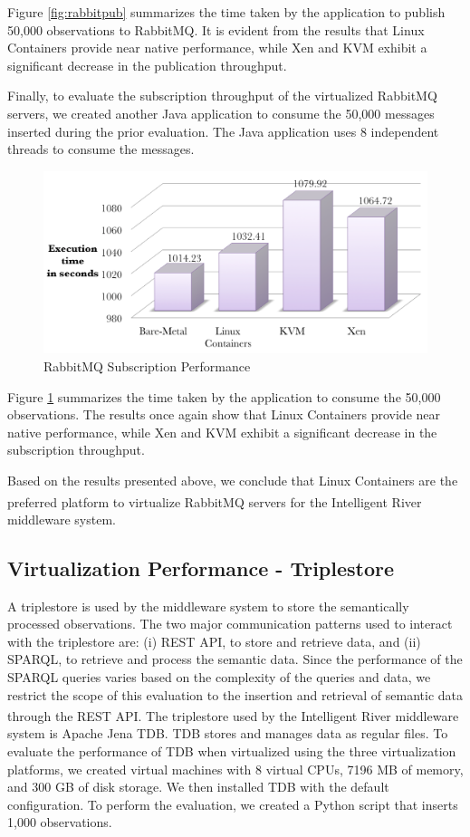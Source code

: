 Figure \ref{fig:rabbitpub} summarizes the time taken by the application to publish 50,000 observations to RabbitMQ. It is evident from the results that Linux Containers provide near native performance, while Xen and KVM exhibit a significant decrease in the publication throughput.

Finally, to evaluate the subscription throughput of the virtualized RabbitMQ servers, we created another Java application to consume the 50,000 messages inserted during the prior evaluation. The Java application uses 8 independent threads to consume the messages.

\begin{figure}[H]
\centering
\includegraphics[width=150mm]{rabbitsub.png}
\caption{RabbitMQ Subscription Performance}
\label{fig:rabbitsub}
\end{figure}

Figure \ref{fig:rabbitsub} summarizes the time taken by the application to consume the 50,000 observations. The results once again show that Linux Containers provide near native performance, while Xen and KVM exhibit a significant decrease in the subscription throughput.

Based on the results presented above, we conclude that Linux Containers are the preferred platform to virtualize RabbitMQ servers for the Intelligent River\textsuperscript{\textregistered} middleware system.


\subsection{Virtualization Performance - Triplestore}

A triplestore is used by the middleware system to store the semantically processed observations. The two major communication patterns used to interact with the triplestore are: (i) REST API, to store and retrieve data, and (ii) SPARQL, to retrieve and process the semantic data. Since the performance of the SPARQL queries varies based on the complexity of the queries and data, we restrict the scope of this evaluation to the insertion and retrieval of semantic data through the REST API. The triplestore used by the Intelligent River\textsuperscript{\textregistered} middleware system is Apache Jena TDB. TDB stores and manages data as regular files. To evaluate the performance of TDB when virtualized using the three virtualization platforms, we created virtual machines with 8 virtual CPUs, 7196 MB of memory, and 300 GB of disk storage. We then installed TDB with the default configuration. To perform the evaluation, we created a Python script that inserts 1,000 observations.


